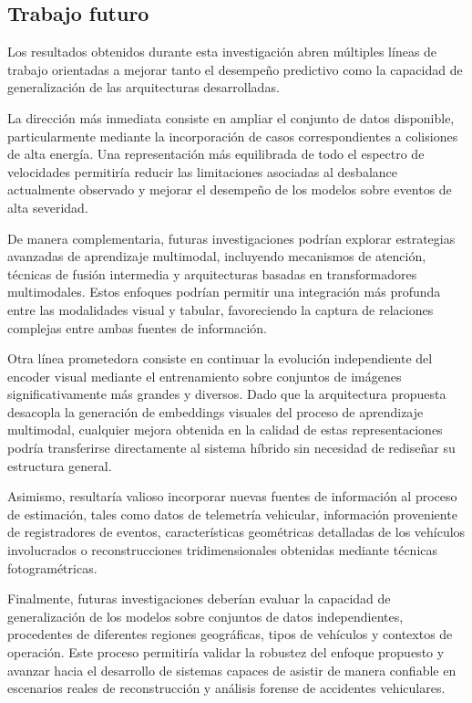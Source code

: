 \documentclass[esp]{SpeedEstimationAI_paper}
\begin{document}
\subsection{Trabajo futuro}

Los resultados obtenidos durante esta investigación abren múltiples líneas de trabajo orientadas a mejorar tanto el desempeño predictivo como la capacidad de generalización de las arquitecturas desarrolladas.

La dirección más inmediata consiste en ampliar el conjunto de datos disponible, particularmente mediante la incorporación de casos correspondientes a colisiones de alta energía. Una representación más equilibrada de todo el espectro de velocidades permitiría reducir las limitaciones asociadas al desbalance actualmente observado y mejorar el desempeño de los modelos sobre eventos de alta severidad.

De manera complementaria, futuras investigaciones podrían explorar estrategias avanzadas de aprendizaje multimodal, incluyendo mecanismos de atención, técnicas de fusión intermedia y arquitecturas basadas en transformadores multimodales. Estos enfoques podrían permitir una integración más profunda entre las modalidades visual y tabular, favoreciendo la captura de relaciones complejas entre ambas fuentes de información.

Otra línea prometedora consiste en continuar la evolución independiente del encoder visual mediante el entrenamiento sobre conjuntos de imágenes significativamente más grandes y diversos. Dado que la arquitectura propuesta desacopla la generación de embeddings visuales del proceso de aprendizaje multimodal, cualquier mejora obtenida en la calidad de estas representaciones podría transferirse directamente al sistema híbrido sin necesidad de rediseñar su estructura general.

Asimismo, resultaría valioso incorporar nuevas fuentes de información al proceso de estimación, tales como datos de telemetría vehicular, información proveniente de registradores de eventos, características geométricas detalladas de los vehículos involucrados o reconstrucciones tridimensionales obtenidas mediante técnicas fotogramétricas.

Finalmente, futuras investigaciones deberían evaluar la capacidad de generalización de los modelos sobre conjuntos de datos independientes, procedentes de diferentes regiones geográficas, tipos de vehículos y contextos de operación. Este proceso permitiría validar la robustez del enfoque propuesto y avanzar hacia el desarrollo de sistemas capaces de asistir de manera confiable en escenarios reales de reconstrucción y análisis forense de accidentes vehiculares.
\end{document}
